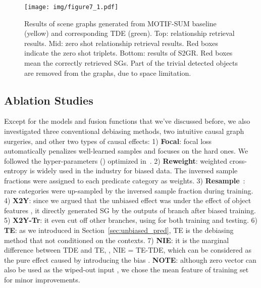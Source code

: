 \documentclass[10pt,twocolumn,letterpaper]{article}
\begin{document}
\begin{figure*}
   \begin{minipage}[b]{1.0\linewidth}
   \centerline{\texttt{[image: img/figure7\_1.pdf]}}
   \end{minipage}
   \caption{ Results of scene graphs generated from MOTIF\textsuperscript{}-SUM baseline (yellow) and corresponding TDE (green). Top: relationship retrieval results. Mid: zero shot relationship retrieval results. Red boxes indicate the zero shot triplets. Bottom: results of S2GR. Red boxes mean the correctly retrieved SGs. Part of the trivial detected objects are removed from the graphs, due to space limitation.}
   \label{fig:7} \vspace{-0.2in}
\end{figure*}

\vspace{-0.05in}
\subsection{Ablation Studies}
\vspace{-0.05in}
Except for the models and fusion functions that we've discussed before, we also investigated three conventional debiasing methods, two intuitive causal graph surgeries, and other two types of causal effects: 1) \textbf{Focal}: focal loss~\cite{lin2017focal} automatically penalizes well-learned samples and focuses on the hard ones. We followed the  hyper-parameters () optimized in~\cite{lin2017focal}. 2) \textbf{Reweight}: weighted cross-entropy is widely used in the industry for biased data. The inversed sample fractions were assigned to each predicate category as weights. 3) \textbf{Resample}~\cite{burnaev2015influence}: rare categories were up-sampled by the inversed sample fraction during training. 4) \textbf{X2Y}: since we argued that the unbiased effect was under the effect of object features , it directly generated SG by the outputs of  branch after biased training. 5) \textbf{X2Y-Tr}: it even cut off other branches, using  for both training and testing. 6) \textbf{TE}: as we introduced in Section~\ref{sec:unbiased_pred}, TE is the debiasing method that not conditioned on the contexts. 7) \textbf{NIE}: it is the marginal difference between TDE and TE, \ie, NIE = TE-TDE, which can be considered as the pure effect caused by introducing the bias . \textbf{NOTE}: although zero vector can also be used as the wiped-out input , we chose the mean feature of training set for minor improvements.
\end{document}
